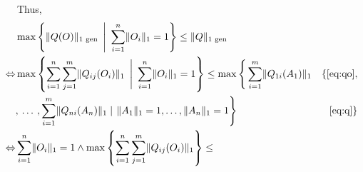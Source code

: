Thus, 
\begin{align*}
  \hspace{-30pt}&   \max \left\{ \lVert Q(O) \rVert_{1 \text{ gen}} \hspace{2pt}  \Biggm| \hspace{2pt}  \sum_{i=1}^{n} \lVert O_i  \rVert_1 = 1 \right\} \leq \lVert Q \rVert_{1 \text{ gen}} \\
  \hspace{-30pt} \Leftrightarrow  & 
  \max \left\{   \sum_{i=1}^{n} \sum_{j=1}^{m} \lVert Q_{ij} (O_{i}) \rVert_{1} \hspace{2pt}  \Biggm| \hspace{2pt}  \sum_{i=1}^{n} \lVert O_i  \rVert_1 = 1 \right\} \leq \max \Bigg\{  \sum_{i=1}^{m}  \lVert Q_{1i} (A_{1}) \rVert_{1} &   \{\text{\autoref{eq:qo}}, \\
  \hspace{-30pt}& , \hspace{2pt} \ldots \hspace{2pt}, \sum_{i=1}^{m} \lVert Q_{ni} (A_{n}) \rVert_{1} \mid \hspace{1pt}   \lVert A_{1} \rVert_{1} = 1 , \ldots,\lVert A_{n} \rVert_{1} = 1 \Bigg\}   & \text{\autoref{eq:q}} \}  \\
  \hspace{-30pt} \Leftrightarrow  &  \sum_{i=1}^{n} \lVert O_i  \rVert_1 = 1   \wedge \max \left\{ \sum_{i=1}^{n} \sum_{j=1}^{m} \lVert Q_{ij} (O_{i}) \rVert_{1} \right\} \leq  \\

\end{align*}
